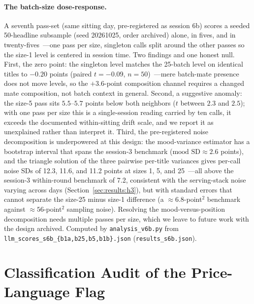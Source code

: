 \paragraph{The batch-size dose-response.} A seventh pass-set (same sitting day, pre-registered as session 6b) scores a seeded 50-headline subsample (seed 20261025, order archived) alone, in fives, and in twenty-fives~---one pass per size, singleton calls split around the other passes so the size-1 level is centered in session time. Two findings and one honest null. First, the zero point: the singleton level matches the 25-batch level on identical titles to $-0.20$ points (paired $t=-0.09$, $n=50$)~---mere batch-mate presence does not move levels, so the $+3.6$-point composition channel requires a changed mate composition, not batch context in general. Second, a suggestive anomaly: the size-5 pass sits $5.5$--$5.7$ points below both neighbors ($t$ between $2.3$ and $2.5$); with one pass per size this is a single-session reading carried by ten calls, it exceeds the documented within-sitting drift scale, and we report it as unexplained rather than interpret it. Third, the pre-registered noise decomposition is underpowered at this design: the mood-variance estimator has a bootstrap interval that spans the session-3 benchmark ($\text{mood SD}\approx2.6$ points), and the triangle solution of the three pairwise per-title variances gives per-call noise SDs of 12.3, 11.6, and 11.2 points at sizes 1, 5, and 25~---all above the session-3 within-round benchmark of 7.2, consistent with the serving-stack noise varying across days (Section~\ref{sec:results:h3}), but with standard errors that cannot separate the size-25 minus size-1 difference (a $\approx 6.8$-point$^2$ benchmark against $\approx 56$-point$^2$ sampling noise). Resolving the mood-versus-position decomposition needs multiple passes per size, which we leave to future work with the design archived. Computed by \texttt{analysis\_v6b.py} from \texttt{llm\_scores\_s6b\_\{b1a,b25,b5,b1b\}.json} (\texttt{results\_s6b.json}).


\section{Classification Audit of the Price-Language Flag}\label{app:classification}

